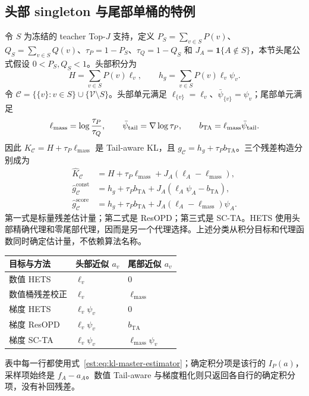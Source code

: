 \subsection{头部 singleton 与尾部单桶的特例}

令 $S$ 为冻结的 teacher Top-$J$ 支持，定义 $P_S=\sum_{v\in S}P(v)$、$Q_S=\sum_{v\in S}Q(v)$、$\tau_P=1-P_S$、$\tau_Q=1-Q_S$ 和 $J_A=\mathbf1\{A\notin S\}$，本节头尾公式假设 $0<P_S,Q_S<1$。头部积分为
\begin{equation*}
 H=\sum_{v\in S}P(v)\ell_v,\qquad h_g=\sum_{v\in S}P(v)\ell_v\psi_v.
\end{equation*}
令 $\mathcal C=\{\{v\}:v\in S\}\cup\{\mathcal V\setminus S\}$。头部单元满足 $\ell_{\{v\}}=\ell_v$、$\bar\psi_{\{v\}}=\psi_v$；尾部单元满足
\begin{equation*}
 \ell_{\mathrm{mass}}=\log\frac{\tau_P}{\tau_Q},\qquad
 \bar \psi_{\mathrm{tail}}=\nabla\log\tau_P,\qquad
 b_{\mathrm{TA}}=\ell_{\mathrm{mass}}\bar \psi_{\mathrm{tail}}.
\end{equation*}
因此 $K_{\mathcal C}=H+\tau_P\ell_{\mathrm{mass}}$ 是 Tail-aware KL，且 $g_{\mathcal C}=h_g+\tau_Pb_{\mathrm{TA}}$。三个残差构造分别成为
\begin{align*}
 \widehat K_{\mathcal C}
 &=H+\tau_P\ell_{\mathrm{mass}}+J_A(\ell_A-\ell_{\mathrm{mass}}),\\
 \widehat g_{\mathcal C}^{\mathrm{const}}
 &=h_g+\tau_Pb_{\mathrm{TA}}+J_A(\ell_A\psi_A-b_{\mathrm{TA}}),\\
 \widehat g_{\mathcal C}^{\mathrm{score}}
 &=h_g+\tau_Pb_{\mathrm{TA}}+J_A(\ell_A-\ell_{\mathrm{mass}})\psi_A.
\end{align*}
第一式是标量残差估计量；第二式是 ResOPD；第三式是 SC-TA。HETS 使用头部精确代理和零尾部代理，因而是另一个代理选择。上述分类从积分目标和代理函数同时确定估计量，不依赖算法名称。

\begin{center}
\begin{tabular}{lll}
\toprule
目标与方法 & 头部近似 $a_v$ & 尾部近似 $a_v$\\
\midrule
数值 HETS & $\ell_v$ & $0$\\
数值桶残差校正 & $\ell_v$ & $\ell_{\mathrm{mass}}$\\
梯度 HETS & $\ell_v\psi_v$ & $0$\\
梯度 ResOPD & $\ell_v\psi_v$ & $b_{\mathrm{TA}}$\\
梯度 SC-TA & $\ell_v\psi_v$ & $\ell_{\mathrm{mass}}\psi_v$\\
\bottomrule
\end{tabular}
\end{center}
表中每一行都使用式~\eqref{est:eq:kl-master-estimator}；确定积分项是该行的 $I_P(a)$，采样项始终是 $f_A-a_A$。数值 Tail-aware 与梯度粗化则只返回各自行的确定积分项，没有补回残差。

